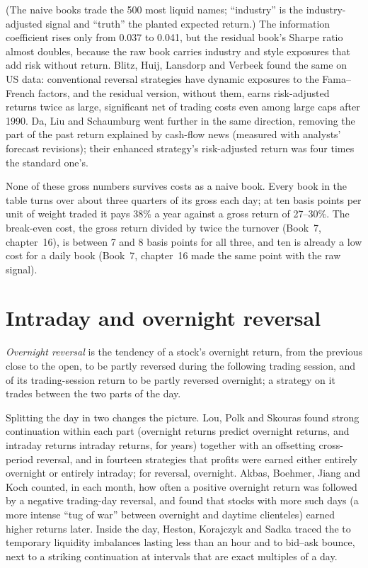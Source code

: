 (The naive books trade the 500 most liquid names; ``industry'' is the industry-adjusted signal and ``truth'' the planted
expected return.) The information coefficient rises only from 0.037 to 0.041, but the residual book's Sharpe ratio almost doubles, because the raw book carries industry and
style exposures that add risk without return. Blitz, Huij, Lansdorp and Verbeek found the same on US data: conventional reversal strategies have dynamic
exposures to the Fama--French factors, and the residual version, without them, earns risk-adjusted returns twice as large, significant net of trading costs
even among large caps after 1990. Da, Liu and Schaumburg went further in the same direction, removing the part of the past return explained by cash-flow news
(measured with analysts' forecast revisions); their enhanced strategy's risk-adjusted return was four times the standard one's.

None of these gross numbers survives costs as a naive book. Every book in the table turns over about three quarters of its gross each day; at ten basis
points per unit of weight traded it pays 38\% a year against a gross return of 27--30\%. The break-even cost, the gross return divided by twice the turnover (Book~7, chapter~16),
is between 7 and 8 basis points for all three, and ten is already a low cost for a daily book (Book~7, chapter~16 made the same point with the raw signal).

\section{Intraday and overnight reversal}

\begin{definition}\label{def:s1:short-term-reversal:overnight}
\emph{Overnight reversal} is the tendency of a stock's overnight return, from the previous close to the open, to be partly reversed
during the following trading session, and of its trading-session return to be partly reversed overnight; a strategy on it trades between the two parts of the
day.
\end{definition}

Splitting the day in two changes the picture. Lou, Polk and Skouras found strong continuation within each part (overnight returns predict overnight returns, and
intraday returns intraday returns, for years) together with an offsetting cross-period reversal, and in fourteen strategies that profits were earned either
entirely overnight or entirely intraday; for reversal, overnight. Akbas, Boehmer, Jiang and Koch counted, in each month, how often a positive overnight return
was followed by a negative trading-day reversal, and found that stocks with more such days (a more intense ``tug of war'' between overnight and daytime
clienteles) earned higher returns later. Inside the day, Heston, Korajczyk and Sadka traced the  to temporary liquidity imbalances lasting
less than an hour and to bid--ask bounce, next to a striking continuation at intervals that are exact multiples of a day.

